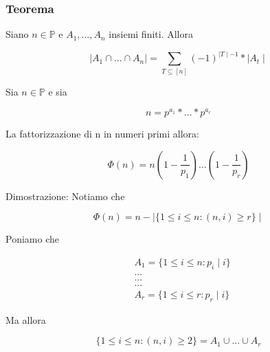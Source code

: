 \documentclass{article}
\begin{document}
        \subsubsection{Teorema}
        \begin{flushleft}
          Siano $n \in \mathbb{P}$ e $A_1,...,A_n$ insiemi finiti. Allora
        \end{flushleft}
        \begin{equation}
          \mid A_1 \cap ... \cap A_n \mid = \sum_{T \subseteq [n]} (-1)^{\mid T \mid -1}*\mid A_t \mid 
        \end{equation}
        \begin{flushleft}
          Sia $n \in \mathbb{P}$ e sia
        \end{flushleft}
        \begin{equation}
          n = p^{a_{1}}*...*p^{a_{r}}
        \end{equation}
        \begin{flushleft}
          La fattorizzazione di n in numeri primi allora:
        \end{flushleft}
        \begin{equation}
          \Phi (n) = n(1-\frac{1}{p_1})...(1-\frac{1}{p_r})
        \end{equation}
        \begin{flushleft}
          Dimostrazione: Notiamo che 
        \end{flushleft}
        \begin{equation}
          \Phi (n) = n-\mid \{ 1 \leq i \leq n:(n,i) \geq r \} \mid
        \end{equation}
        \begin{flushleft}
          Poniamo che
        \end{flushleft}
        \begin{equation}
          \begin{split}
            & A_1=\{ 1 \leq i \leq n : p_i \mid i \} \\
            &...\\ 
            &... \\ 
            &... \\
            & A_r=\{ 1 \leq i \leq r : p_r \mid i \}
          \end{split}
        \end{equation}
        \begin{flushleft}
          Ma allora
        \end{flushleft}
        \begin{equation}
          \{ 1 \leq i \leq n: (n,i) \geq 2 \}= A_1 \cup ... \cup A_r
        \end{equation}
\end{document}
